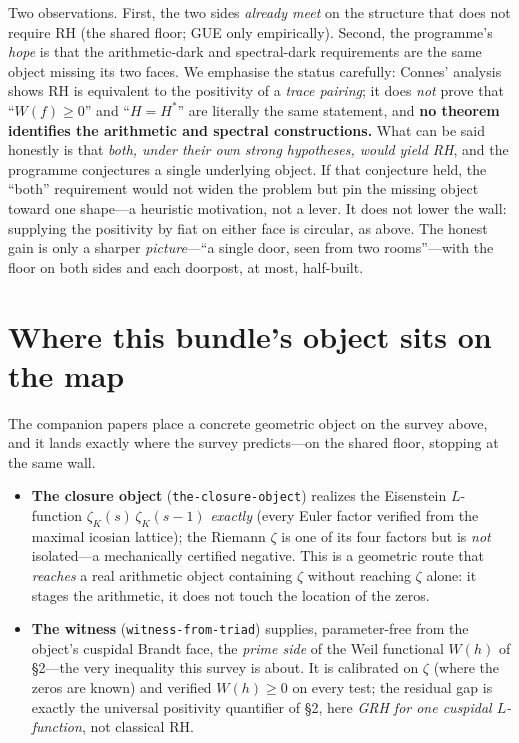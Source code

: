 \documentclass[11pt]{article}
\newcommand{\zetaK}{\zeta_{K}}\newcommand{\F}{\mathbb{F}}
\begin{document}
\noindent Two observations. First, the two sides \emph{already meet} on the structure
that does not require RH (the shared floor; GUE only empirically). Second, the
programme's \emph{hope} is that the arithmetic-dark and spectral-dark requirements are
the same object missing its two faces. We emphasise the status carefully: Connes'
analysis shows RH is equivalent to the positivity of a \emph{trace pairing}; it does
\emph{not} prove that ``$W(f)\ge 0$'' and ``$H=H^*$'' are literally the same statement,
and \textbf{no theorem identifies the arithmetic and spectral constructions.} What can
be said honestly is that \emph{both, under their own strong hypotheses, would yield RH},
and the programme conjectures a single underlying object. If that conjecture held, the
``both'' requirement would not widen the problem but pin the missing object toward one
shape---a heuristic motivation, not a lever. It does not lower the wall: supplying the
positivity by fiat on either face is circular, as above. The honest gain is only a
sharper \emph{picture}---``a single door, seen from two rooms''---with the floor on both
sides and each doorpost, at most, half-built.

\section{Where this bundle's object sits on the map}\label{sec:object-on-map}
The companion papers place a concrete geometric object on the survey above, and it
lands exactly where the survey predicts---on the shared floor, stopping at the same wall.

\begin{itemize}\itemsep2pt
\item \textbf{The closure object} (\texttt{the-closure-object}) realizes the Eisenstein
$L$-function $\zetaK(s)\,\zetaK(s-1)$ \emph{exactly} (every Euler factor verified from
the maximal icosian lattice); the Riemann $\zeta$ is one of its four factors but is
\emph{not} isolated---a mechanically certified negative. This is a geometric route that
\emph{reaches} a real arithmetic object containing $\zeta$ without reaching $\zeta$
alone: it stages the arithmetic, it does not touch the location of the zeros.
\item \textbf{The witness} (\texttt{witness-from-triad}) supplies, parameter-free from
the object's cuspidal Brandt face, the \emph{prime side} of the Weil functional $W(h)$
of \S2---the very inequality this survey is about. It is calibrated on $\zeta$ (where
the zeros are known) and verified $W(h)\ge0$ on every test; the residual gap is exactly
the universal positivity quantifier of \S2, here \emph{GRH for one cuspidal
$L$-function}, not classical RH.
\end{itemize}
\end{document}
